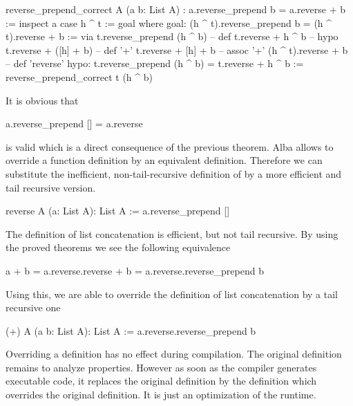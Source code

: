 \begin{alba}
  reverse_prepend_correct
    A (a b: List A)
    : a.reverse_prepend b = a.reverse + b :=
      inspect a case
        h ^ t :=
          goal where
            goal: (h ^ t).reverse_prepend  b = (h ^ t).reverse + b :=
              via
                t.reverse_prepend (h ^ b)            -- def
                t.reverse + h ^ b                    -- hypo
                t.reverse + ([h] + b)                -- def '+'
                t.reverse + [h] + b                  -- assoc '+'
                (h ^ t).reverse + b                  -- def 'reverse'
             hypo: t.reverse_prepend (h ^ b) = t.reverse + h ^ b :=
               reverse_prepend_correct t (h ^ b)
\end{alba}


It is obvious that
%
\begin{alba}
  a.reverse_prepend [] = a.reverse
\end{alba}
%
is valid which is a direct consequence of the previous theorem. Alba allows to
override a function definition by an equivalent definition. Therefore we can
substitute the inefficient, non-tail-recursive definition of  by
a more efficient and tail recursive version.

\begin{alba}
  reverse A (a: List A): List A :=
    a.reverse_prepend []
\end{alba}

The definition of list concatenation is efficient, but not tail recursive. By
using the proved theorems we see the following equivalence
%
\begin{alba}
  a + b   =  a.reverse.reverse + b
          =  a.reverse.reverse_prepend b
\end{alba}

Using this, we are able to override the definition of list concatenation by a
tail recursive one

\begin{alba}
  (+) A (a b: List A): List A :=
    a.reverse.reverse_prepend b
\end{alba}

Overriding a definition has no effect during compilation. The original
definition remains to analyze properties. However as soon as the compiler
generates executable code, it replaces the original definition by the
definition which overrides the original definition. It is just an optimization
of the runtime.






